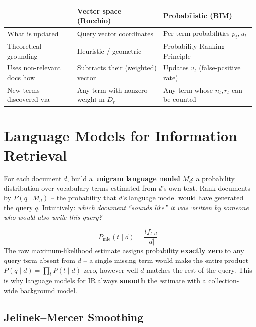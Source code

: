\documentclass[11pt, a4paper]{article}
\begin{document}
\begin{center}
\begin{tabular}{@{}p{3.4cm}p{5.6cm}p{5.6cm}@{}}
\toprule
 & \textbf{Vector space (Rocchio)} & \textbf{Probabilistic (BIM)} \\
\midrule
What is updated & Query vector coordinates & Per-term probabilities $p_t,u_t$ \\
Theoretical grounding & Heuristic / geometric & Probability Ranking Principle \\
Uses non-relevant docs how & Subtracts their (weighted) vector & Updates $u_t$ (false-positive rate) \\
New terms discovered via & Any term with nonzero weight in $D_r$ & Any term whose $n_t,r_t$ can be counted \\
\bottomrule
\end{tabular}
\end{center}

\section{Language Models for Information Retrieval}

\begin{defbox}
For each document $d$, build a \textbf{unigram language model} $M_d$: a probability distribution over vocabulary terms estimated from $d$'s own text. Rank documents by $P(q \mid M_d)$ -- the probability that $d$'s language model would have generated the query $q$. Intuitively: \emph{which document ``sounds like'' it was written by someone who would also write this query?}
\end{defbox}

\begin{formulabox}
\[
P_{\text{mle}}(t \mid d) = \frac{tf_{t,d}}{|d|}
\]
The raw maximum-likelihood estimate assigns probability \textbf{exactly zero} to any query term absent from $d$ -- a single missing term would make the entire product $P(q\mid d)=\prod_t P(t\mid d)$ zero, however well $d$ matches the rest of the query. This is why language models for IR always \textbf{smooth} the estimate with a collection-wide background model.
\end{formulabox}

\subsection{Jelinek--Mercer Smoothing}
\end{document}
